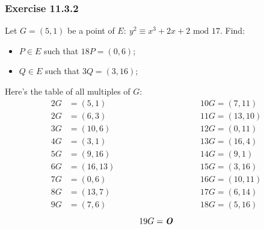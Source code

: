 \documentclass[11pt, a4paper]{article}
\newcommand{\mymod}{
    \text{ mod }
}
\begin{document}
\subsubsection{Exercise 11.3.2}
Let $G=(5,1)$ be a point of $E:\ y^2\equiv x^3+2x+2\mymod17$. Find:
\begin{itemize}
    \item $P\in E$ such that $18P=(0,6)$;
    \item $Q\in E$ such that $3Q=(3,16)$;
\end{itemize}
Here's the table of all multiples of $G$:
\begin{alignat*}{2}
    G&=(5,1)\hspace{4cm}&&10G=(7,11)\\
    2G&=(6,3)&&11G=(13,10)\\
    3G&=(10,6)&&12G=(0,11)\\
    4G&=(3,1)&&13G=(16,4)\\
    5G&=(9,16)&&14G=(9,1)\\
    6G&=(16,13)&&15G=(3,16)\\
    7G&=(0,6)&&16G=(10,11)\\
    8G&=(13,7)&&17G=(6,14)\\
    9G&=(7,6)&&18G=(5,16)
\end{alignat*}
$$19G=\text{\textbf{\textit{O}}}$$
\end{document}
